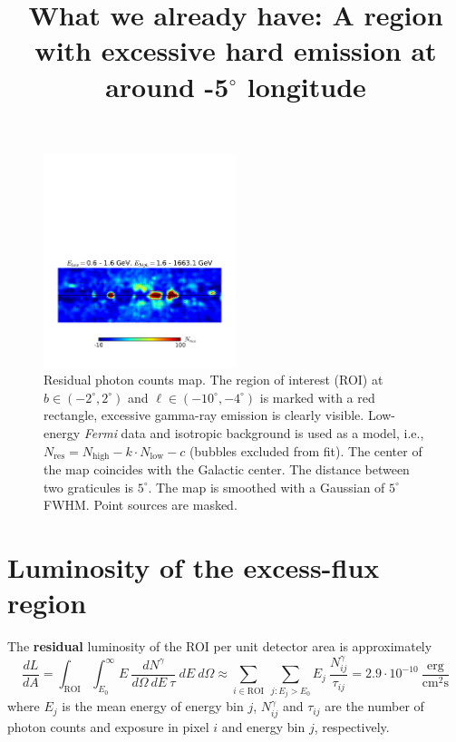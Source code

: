 \documentclass[a4paper]{article}
\begin{document}
\title{What we already have: A region with excessive hard emission at around -5$^\circ$ longitude}
\maketitle

\begin{figure}[h]
\vspace*{-3cm}
	\centering
	\includegraphics[width=0.5\textwidth]{gnomview_1}
    \caption{Residual photon counts map. The region of interest (ROI) at $b \in (-2^\circ, 2^\circ)$ and $\ell \in (-10^\circ, -4^\circ)$ is marked with a red rectangle, excessive gamma-ray emission is clearly visible. Low-energy \textit{Fermi} data and isotropic background is used as a model, i.e., $N_\text{res} = N_\text{high} - k \cdot N_\text{low} - c$ (bubbles excluded from fit). The center of the map coincides with the Galactic center. The distance between two graticules is $5^\circ$. The map is smoothed with a Gaussian of $5^\circ$ FWHM. Point sources are masked.}
    \label{gnomview}
\end{figure}

\section{Luminosity of the excess-flux region}
The \textbf{residual} luminosity of the ROI per unit detector area is approximately 
\begin{equation}
\label{eq_dLdA}
\frac{dL}{dA} = \int_\text{ROI} \int_{E_0}^\infty E\ \frac{dN^\gamma}{d\Omega\ dE\ \tau}\ dE\ d\Omega \approx \sum_{i \in \text{ROI}}\ \sum_{j: E_j > E_0}  E_j\ \frac{N_{ij}^\gamma}{\tau_{ij}} = 2.9 \cdot 10^{-10}\ \frac{\text{erg}}{\text{cm}^2\text{s}}
\end{equation}
where $E_j$ is the mean energy of energy bin $j$, $N_{ij}^\gamma$ and $\tau_{ij}$ are the number of photon counts and exposure in pixel $i$ and energy bin $j$, respectively.\\
\end{document}
